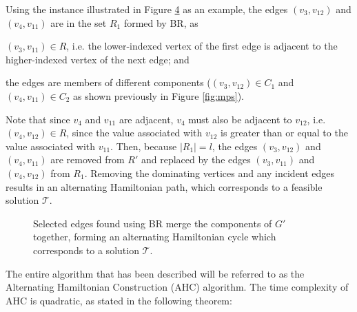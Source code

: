\documentclass[runningheads]{llncs}
\begin{document}
Using the instance illustrated in Figure \ref{fig:connect/cycle} as an example, the edges $(v_3, v_{12})$ and $(v_4, v_{11})$ are in the set $R_1$ formed by BR, as \begin{enumerate*}[label={(\alph*)}]
	\item $(v_3, v_{11}) \in R$, i.e. the lower-indexed vertex of the first edge is adjacent to the higher-indexed vertex of the next edge; and
	\item the edges are members of different components ($(v_3, v_{12}) \in C_1$ and $(v_4, v_{11}) \in C_2$ as shown previously in Figure \ref{fig:mps}).
\end{enumerate*}
Note that since $v_4$ and $v_{11}$ are adjacent, $v_4$ must also be adjacent to $v_{12}$, i.e. $(v_4, v_{12}) \in R$, since the value associated with $v_{12}$ is greater than or equal to the value associated with $v_{11}$. Then, because $|R_1| = l$, the edges $(v_3, v_{12})$ and $(v_4, v_{11})$ are removed from $R'$ and replaced by the edges $(v_3, v_{11})$ and $(v_4, v_{12})$ from $R_1$. Removing the dominating vertices and any incident edges results in an alternating Hamiltonian path, which corresponds to a feasible solution $\mathcal{T}$. 

\begin{figure}	
	\centering
	\begin{subfigure}[H]{0.65\textwidth}
		
		\label{fig:mpsconnect}
	\end{subfigure}
	\begin{subfigure}[H]{0.65\textwidth}
		
		\label{fig:mpscycle}
	\end{subfigure}
	\begin{subfigure}[H]{0.75\textwidth}
		
		\label{fig:mpspath}
	\end{subfigure}
	\caption{Selected edges found using BR merge the components of $G'$ together, forming an alternating Hamiltonian cycle which corresponds to a solution $\mathcal{T}$.}
	\label{fig:connect/cycle}
\end{figure}

\noindent The entire algorithm that has been described will be referred to as the Alternating Hamiltonian Construction (AHC) algorithm. The time complexity of AHC is quadratic, as stated in the following theorem:
\end{document}
